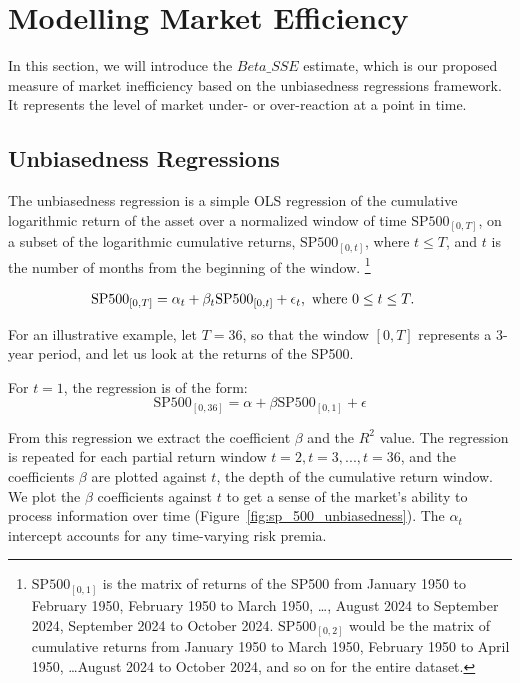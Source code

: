 \section{Modelling Market Efficiency}
\label{sec:market_efficiency}

In this section, we will introduce the $Beta\_SSE$ estimate, which is our proposed measure of market inefficiency based on the unbiasedness regressions framework. It represents the level of
market under- or over-reaction at a point in time.

\subsection{Unbiasedness Regressions}

\noindent The unbiasedness regression is a simple OLS regression of the cumulative logarithmic return of the asset over a normalized window of time $\mathrm{SP500}_{[0, T]}$, on a subset of the
logarithmic cumulative returns, $\mathrm{SP500}_{[0, t]}$, where $t \leq T$, and $t$ is the number of months from the beginning of the window.
 \footnote{$\mathrm{SP500}_{[0, 1]}$ is the matrix of returns of the SP500 from January 1950 to February 1950, February 1950 to March 1950, \dots, August 2024 to September 2024, September 2024 to October 2024.\newline
$\mathrm{SP500}_{[0, 2]}$ would be the matrix of cumulative returns from January 1950 to March 1950, February 1950 to April 1950, \dots August 2024 to October 2024, and so on for the entire dataset.}

\begin{equation}
    \begin{aligned}
        \mathrm{SP500}_{[0, T]} &= \alpha_t + \beta_t \mathrm{SP500}_{[0, t]} + \epsilon_{t}, \hfill \text{   where } 0 \leq t \leq T.
    \end{aligned}
\end{equation}

\noindent For an illustrative example, let $T = 36$, so that the window $[0, T]$ represents a 3-year period, and let us look at the returns of the SP500.

\noindent For $t=1$, the regression is of the form:
\begin{equation}
    \mathrm{SP500}_{[0, 36]} = \alpha + \beta \mathrm{SP500}_{[0, 1]} + \epsilon
\end{equation}

\noindent From this regression we extract the coefficient $\beta$ and the $R^2$ value.
The regression is repeated for each partial return window $t=2, t=3, ..., t=36$, and the coefficients $\beta$ are plotted against $t$, the depth of the cumulative return window.
We plot the $\beta$ coefficients against $t$ to get a sense of the market's ability to process information over time (Figure~\ref{fig:sp_500_unbiasedness}). The $\alpha_t$ intercept
 accounts for any time-varying risk premia.


